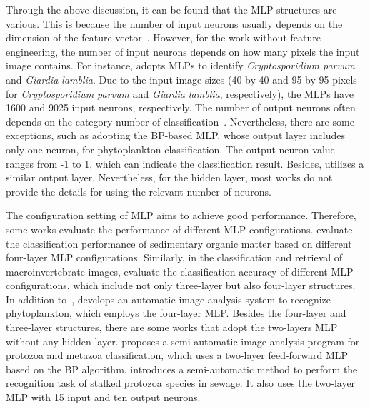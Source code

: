 Through the above discussion, it can be found that the MLP structures are various. This is because the number of input neurons usually depends on the dimension of the feature vector~\cite{Embleton-2003-ACPP}. However, for the work without feature engineering, the number of input neurons depends on how many pixels the input image contains. For instance, \cite{Widmer-2005-UANN} adopts MLPs to identify \emph{Cryptosporidium parvum} and \emph{Giardia lamblia}. Due to the input image sizes (40 by 40 and 95 by 95 pixels for \emph{Cryptosporidium parvum} and \emph{Giardia lamblia}, respectively), the MLPs have 1600 and 9025 input neurons, respectively. The number of output neurons often depends on the category number of classification~\cite{Weller-2005-SCSO}. Nevertheless, there are some exceptions, such as \cite{Embleton-2003-ACPP} adopting the BP-based MLP, whose output layer includes only one neuron, for phytoplankton classification. The output neuron value ranges from -1 to 1, which can indicate the classification result. Besides, \cite{Danping-2013-IPMS} utilizes a similar output layer. Nevertheless, for the hidden layer, most works do not provide the details for using the relevant number of neurons.  


The configuration setting of MLP aims to achieve good performance. Therefore, some works evaluate the performance of different MLP configurations. \cite{Weller-2005-SCSO,Weller-2007-TSNN} evaluate the classification performance of sedimentary organic matter based on different four-layer MLP configurations. Similarly, in the classification and retrieval of macroinvertebrate images, \cite{Kiranyaz-2011-CRMI} evaluate the classification accuracy of different MLP configurations, which include not only three-layer but also four-layer structures. In addition to~\cite{Weller-2005-SCSO,Kiranyaz-2011-CRMI}, \cite{Schulze-2013-PAAS} develops an automatic image analysis system to recognize phytoplankton, which employs the four-layer MLP. Besides the four-layer and three-layer structures, there are some works that adopt the two-layers MLP without any hidden layer. \cite{Ginoris-2007-RPMU} proposes a semi-automatic image analysis program for protozoa and metazoa classification, which uses a two-layer feed-forward MLP based on the BP algorithm. \cite{Amaral-2008-SPII} introduces a semi-automatic method to perform the recognition task of stalked protozoa species in sewage. It also uses the two-layer MLP with 15 input and ten output neurons.

